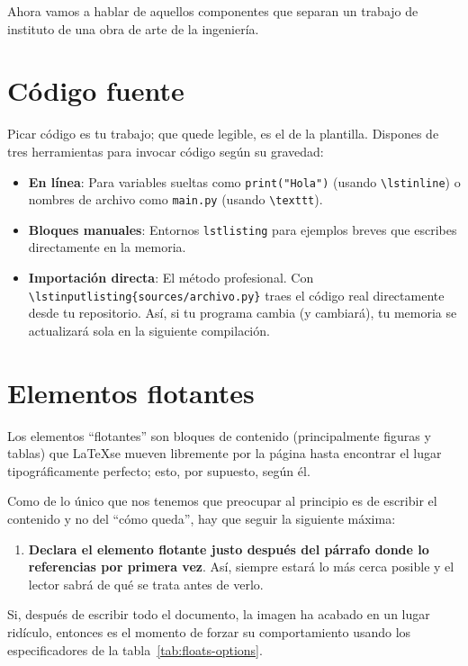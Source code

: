 Ahora vamos a hablar de aquellos componentes que separan un trabajo de instituto de una obra de arte de la ingeniería.

\section{Código fuente}

Picar código es tu trabajo; que quede legible, es el de la plantilla. Dispones de tres herramientas para invocar código según su gravedad:

\begin{itemize}
    \item \textbf{En línea}: Para variables sueltas como \lstinline|print("Hola")| (usando \texttt{\textbackslash lstinline}) o nombres de archivo como \texttt{main.py} (usando \texttt{\textbackslash texttt}).
    \item \textbf{Bloques manuales}: Entornos \texttt{lstlisting} para ejemplos breves que escribes directamente en la memoria.
    \item \textbf{Importación directa}: El método profesional. Con \texttt{\textbackslash lstinputlisting\{sources/archivo.py\}} traes el código real directamente desde tu repositorio. Así, si tu programa cambia (y cambiará), tu memoria se actualizará sola en la siguiente compilación.
\end{itemize}

\section{Elementos flotantes}
\label{s:flotantes}

Los elementos \enquote{flotantes} son bloques de contenido (principalmente figuras y tablas) que \LaTeX se mueven libremente por la página hasta encontrar el lugar tipográficamente perfecto; esto, por supuesto, según él.

Como de lo único que nos tenemos que preocupar al principio es de escribir el contenido y no del \enquote{cómo queda}, hay que seguir la siguiente máxima:

\begin{enumerate}
    \item \textbf{Declara el elemento flotante justo después del párrafo donde lo referencias por primera vez}. Así, siempre estará lo más cerca posible y el lector sabrá de qué se trata antes de verlo.
\end{enumerate}

Si, después de escribir todo el documento, la imagen ha acabado en un lugar ridículo, entonces es el momento de forzar su comportamiento usando los especificadores de la tabla~\ref{tab:floats-options}.

